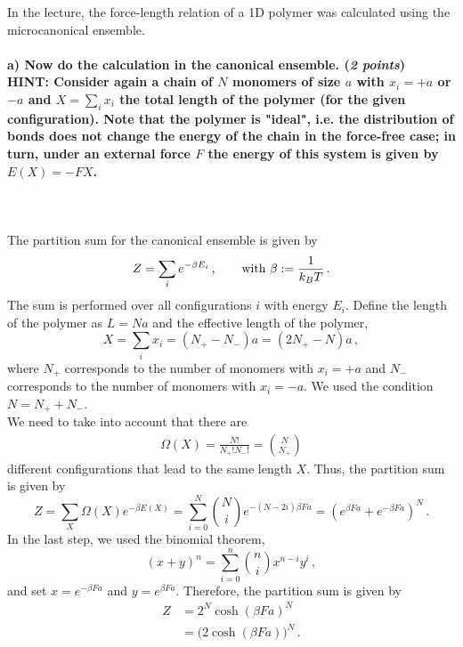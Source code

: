 In the lecture, the force-length relation of a 1D polymer was calculated
using the microcanonical ensemble.

\paragraph{a) Now do the calculation in the canonical ensemble.
    (\textit{2 points}) \\
    HINT: Consider again a chain of $N$ monomers of size $a$ with $x_i=+a$ or 
    $-a$ and $X=\sum_ix_i$ the total length of the polymer (for the given 
    configuration). Note that the polymer is "ideal", i.e. the distribution of 
    bonds does not change the energy of the chain in the force-free case;
    in turn, under an external force $F$ the energy of this system is given by 
    $E(X)=-FX$.
} \ \\
    \\
    The partition sum for the canonical ensemble is given by 
    \begin{equation}
        Z=\sum_i e^{-\beta E_i}
        \,, \ \ \ \ \ \ \textnormal{with }
        \beta:=\frac{1}{k_BT} \,.
    \end{equation}
    The sum is performed over all configurations $i$ with energy $E_i$.
    Define the length of the polymer as $L = Na$ and the effective length
    of the polymer,
    \begin{equation}
    X=\sum_ix_i=(N_+ - N_-)a=(2N_+ - N)a \,,
	\end{equation}        
    where $N_+$ corresponds
    to the number of monomers with $x_i=+a$ and $N_-$ corresponds
    to the number of monomers with $x_i=-a$. We used the condition $N=N_+ + N_-$. \\
    We need to take into account that there are
    \begin{align}
        \Omega(X)
        =\frac{N!}{N_+! N_-!} = \binom{N}{N_+}
    \end{align}
    different configurations that lead to the same length $X$.
    Thus, the partition sum is given by
    \begin{equation}
        Z=\sum_X\Omega(X) e^{-\beta E(X)}
        =\sum_{i=0}^N \binom{N}{i} e^{-(N - 2i) \beta F a} = \left(e^{\beta F a} + e^{-\beta F a}\right)^N \,.
    \end{equation}
    In the last step, we used the binomial theorem,
    \begin{equation}
        (x+y)^n = \sum_{i=0}^n \binom{n}{i} x^{n-i} y^i \,,
    \end{equation}
    and set $x = e^{-\beta F a}$ and $y = e^{\beta F a}$. 
    Therefore, the partition sum is given by
    \begin{align}
        Z
        &=2^N \cosh\left(\beta Fa\right)^N \\
        &=\bigg(2\cosh\left(\beta Fa\right)\bigg)^N \,.
    \end{align}

